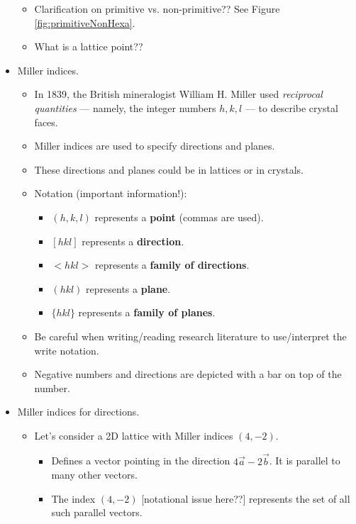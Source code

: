\documentclass[../notes.tex]{subfiles}
\begin{document}
\begin{itemize}
\begin{itemize}
        \item Clarification on primitive vs. non-primitive?? See Figure \ref{fig:primitiveNonHexa}.
        \item What is a lattice point??
    \end{itemize}
    \item Miller indices.
    \begin{itemize}
        \item In 1839, the British mineralogist William H. Miller used \emph{reciprocal quantities} --- namely, the integer numbers $h,k,l$ --- to describe crystal faces.
        \item Miller indices are used to specify directions and planes.
        \item These directions and planes could be in lattices or in crystals.
        \item Notation (important information!):
        \begin{itemize}
            \item $(h,k,l)$ represents a \textbf{point} (commas are used).
            \item $[hkl]$ represents a \textbf{direction}.
            \item $<hkl>$ represents a \textbf{family of directions}.
            \item $(hkl)$ represents a \textbf{plane}.
            \item $\{hkl\}$ represents a \textbf{family of planes}.
        \end{itemize}
        \item Be careful when writing/reading research literature to use/interpret the write notation.
        \item Negative numbers and directions are depicted with a bar on top of the number.
    \end{itemize}
    \item Miller indices for directions.
    \begin{itemize}
        \item Let's consider a 2D lattice with Miller indices $(4,-2)$.
        \begin{itemize}
            \item Defines a vector pointing in the direction $4\vec{a}-2\vec{b}$. It is parallel to many other vectors.
            \item The index $(4,-2)$ [notational issue here??] represents the set of all such parallel vectors.
        \end{itemize}

\end{itemize}
\end{itemize}
\end{document}
